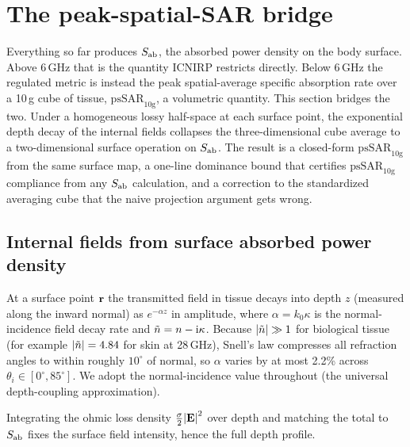 \section{The peak-spatial-SAR bridge}\label{sec:pssar}

\providecommand{\SAR}{\mathrm{SAR}}
\providecommand{\psSAR}{\mathrm{psSAR}_{10\mathrm{g}}}
\providecommand{\rhom}{\rho_{\mathrm{m}}}
\providecommand{\Tzero}{T_{0}}

Everything so far produces $S_{\mathrm{ab}}$, the absorbed power density on the body
surface. Above 6\,GHz that is the quantity ICNIRP restricts directly. Below
6\,GHz the regulated metric is instead the peak spatial-average specific
absorption rate over a 10\,g cube of tissue, $\psSAR$, a volumetric quantity.
This section bridges the two. Under a homogeneous lossy half-space at each
surface point, the exponential depth decay of the internal fields collapses the
three-dimensional cube average to a two-dimensional surface operation on
$S_{\mathrm{ab}}$. The result is a closed-form $\psSAR$ from the same surface map, a
one-line dominance bound that certifies $\psSAR$ compliance from any $S_{\mathrm{ab}}$
calculation, and a correction to the standardized averaging cube that the naive
projection argument gets wrong.

\subsection{Internal fields from surface absorbed power density}
\label{sec:pssar-internal}

At a surface point $\mathbf{r}$ the transmitted field in tissue decays into depth $z$
(measured along the inward normal) as $e^{-\alpha z}$ in amplitude, where
$\alpha = k_0\kappa$ is the normal-incidence field decay rate and
$\tilde{n} = n - \mathrm{i}\kappa$. Because $\abs{\tilde{n}}\gg 1$ for biological
tissue (for example $\abs{\tilde{n}} = 4.84$ for skin at 28\,GHz), Snell's law
compresses all refraction angles to within roughly $10^\circ$ of normal, so
$\alpha$ varies by at most 2.2\% across $\theta_i\in[0^\circ,85^\circ]$. We
adopt the normal-incidence value throughout (the universal depth-coupling
approximation).

Integrating the ohmic loss density $\tfrac{\sigma}{2}\abs{\mathbf{E}}^2$ over depth and
matching the total to $S_{\mathrm{ab}}$ fixes the surface field intensity, hence the full
depth profile.

